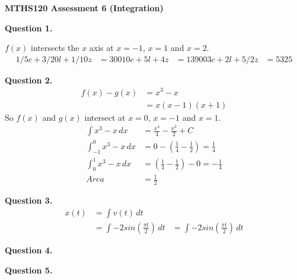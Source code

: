 \documentclass[12pt,a4paper]{report}
\begin{document}
\textbf{MTHS120 Assessment 6 (Integration)}

\textbf{Question 1.}

\(f(x)\) intersects the \(x\) axis at \(x = -1\), \(x = 1\) and \(x = 2\).
\begin{align}

 1/5c + 3/20l + 1/10z &= 300
  10c +    5l +    4z &= 13900
   3c +    2l +  5/2z  &= 5325

\end{align} 

\textbf{Question 2.}
\begin{align}
f(x) - g(x) &= x^3 - x \\
               &= x(x-1)(x+1)
\end{align} 
So \(f(x)\) and \(g(x)\) intersect at \(x = 0\), \(x = -1\) and \(x = 1\).
\begin{align}
\int  x^3 - x \, dx &= \frac{x^4}{4} - \frac{x^2}{2} + C\\
\int_{-1}^{0} x^3 - x \, dx &=  0 - (\frac{1}{4} - \frac{1}{2}) = \frac{1}{4} \\
\int_{0}^{1} x^3 - x \, dx &= (\frac{1}{4} - \frac{1}{2}) - 0 = -\frac{1}{4} \\
Area &= \frac{1}{2}
\end{align} 

\textbf{Question 3.}
\begin{align}
x(t) &= \int v(t) \, dt\\
 &= \int -2 sin(\frac{\pi t}{2}) \, dt
 &= \int -2 sin(\frac{\pi t}{2}) \, dt
\end{align} 


\textbf{Question 4.}

\textbf{Question 5.}
\end{document}
